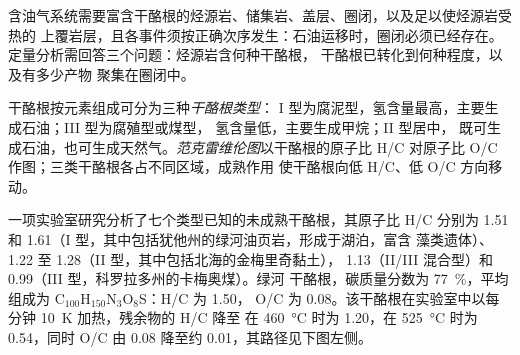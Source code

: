 含油气系统需要富含干酪根的烃源岩、储集岩、盖层、圈闭，以及足以使烃源岩受热的
上覆岩层，且各事件须按正确次序发生：石油运移时，圈闭必须已经存在。
定量分析需回答三个问题：烃源岩含何种干酪根，
干酪根已转化到何种程度，以及有多少产物
聚集在圈闭中。

\begin{definition}\label{def:b2:energy-geology:kerogen}
干酪根按元素组成可分为三种\emph{干酪根类型}：
I 型为腐泥型，氢含量最高，主要生成石油；III 型为腐殖型或煤型，
氢含量低，主要生成甲烷；II 型居中，
既可生成石油，也可生成天然气。\emph{范克雷维伦图}以干酪根的原子比 H/C
对原子比 O/C 作图；三类干酪根各占不同区域，成熟作用
使干酪根向低 H/C、低 O/C 方向移动。
\end{definition}

一项实验室研究分析了七个类型已知的未成熟干酪根，其原子比 H/C 分别为
1.51 和 1.61（I 型，其中包括犹他州的绿河油页岩，形成于湖泊，富含
藻类遗体）、1.22 至 1.28（II 型，其中包括北海的金梅里奇黏土），
1.13（II/III 混合型）和 0.99（III 型，科罗拉多州的卡梅奥煤）。绿河
干酪根，碳质量分数为 \qty{77}{\percent}，平均组成为 C$_{100}$H$_{150}$N$_3$O$_8$S：H/C 为 1.50，
O/C 为 0.08。该干酪根在实验室中以每分钟 \qty{10}{K} 加热，残余物的 H/C 降至
在 \qty{460}{\celsius} 时为 1.20，在 \qty{525}{\celsius} 时为 0.54，同时 O/C 由 0.08 降至约
0.01，其路径见下图左侧。

